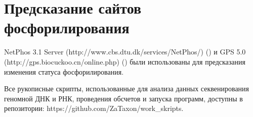 \section{Предсказание сайтов фосфорилирования}

NetPhos 3.1 Server (http://www.cbs.dtu.dk/services/NetPhos/) (\cite{Blom2004}) и GPS 5.0 (http://gps.biocuckoo.cn/online.php) (\cite{Xue2011}) были использованы для предсказания изменения статуса фосфорилирования.


Все рукописные скрипты, использованные для анализа данных секвенирования геномной ДНК и РНК, проведения обсчетов и запуска программ, доступны в репозитории:  https://github.com/ZaTaxon/work\_skripts.